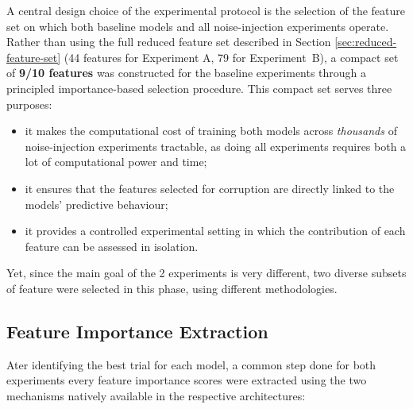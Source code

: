 \documentclass[../main.tex]{subfiles}
\begin{document}
A central design choice of the experimental protocol is the selection of the feature set on which both baseline models and all noise-injection experiments operate.  Rather than using the full reduced feature set described in Section \ref{sec:reduced-feature-set} (44 features for Experiment A, 79 for Experiment~B), a compact set of \textbf{9/10 features} was constructed for the baseline experiments through a principled importance-based selection procedure. This compact set serves three purposes: 
\begin{itemize}
    \item it makes the computational cost of training both models across \emph{thousands} of noise-injection experiments tractable, as doing all experiments requires both a lot of computational power and time;
    \item it ensures that the features selected for corruption are directly linked to the models' predictive behaviour; 
    \item it provides a controlled experimental setting in which the contribution of each feature can be assessed in isolation.
\end{itemize}

Yet, since the main goal of the 2 experiments is very different, two diverse subsets of feature were selected in this phase, using different methodologies.

\subsection{Feature Importance Extraction}
\label{sec:fi-extraction}

Ater identifying the best trial for each model, a common step done for both experiments every feature importance scores were extracted using the two mechanisms natively available in the respective architectures:
\end{document}
